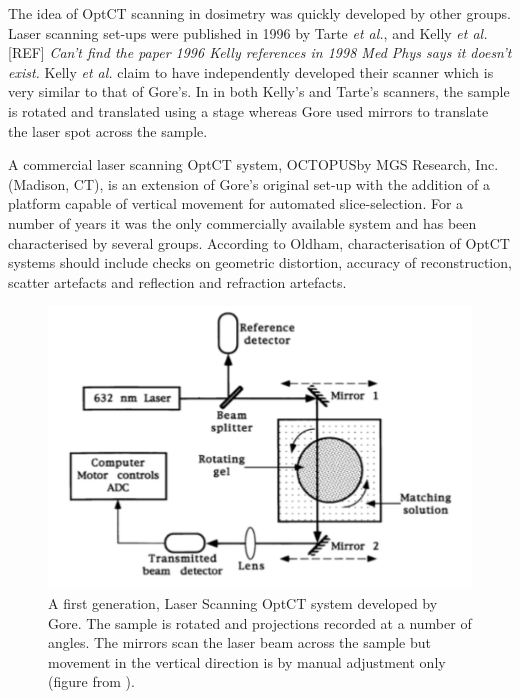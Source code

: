 \documentclass[12pt]{article}
\begin{document}
The idea of OptCT scanning in dosimetry was quickly developed by other groups. Laser scanning set-ups were published in 1996 by Tarte \textit{et al.},  \cite{Tarte:2006} and Kelly \textit{et al.} [REF]
\textit{Can't find the paper 1996 Kelly references in 1998 \cite{Kelly:1998} Med Phys says it doesn't exist.}
Kelly \textit{et al.} claim to have independently developed their scanner which is very similar to that of Gore's. In in both Kelly's and Tarte's  scanners, the sample is rotated and translated using a stage whereas Gore used mirrors to translate the laser spot across the sample. 


A commercial laser scanning OptCT system, OCTOPUS\texttrademark by MGS Research, Inc.
(Madison, CT),  is an extension of Gore's original set-up with the addition of a platform capable of vertical movement for automated slice-selection. \cite{Islam:2003gs} For a number of years it was the only commercially available system and has been characterised by several groups. \cite{Xu:2003cc, Islam:2003gs, Xu:2004iv, Sakhalkar:2009hb} According to Oldham, characterisation of OptCT systems should include checks on geometric distortion, accuracy of reconstruction, scatter artefacts and reflection and refraction artefacts.\cite{Oldham:2004cj}


 


\begin{figure}[H]
\centering
\includegraphics[scale=0.6]{Gore_setup.pdf}
\caption{A first generation,  Laser Scanning OptCT system developed by Gore. The sample is rotated and projections recorded at a number of angles. The  mirrors scan the laser beam across the sample but movement in the vertical direction is by manual adjustment only (figure from \cite{Gore:1999tg}). }
\label{fig:gore_setup}
\end{figure}
\end{document}
